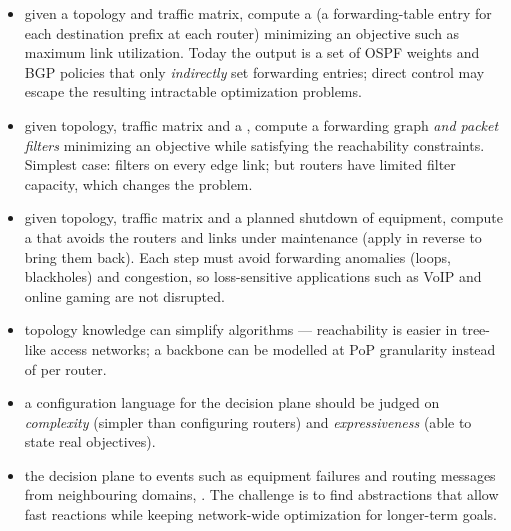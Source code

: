 \begin{itemize}
\item {} given a topology and traffic matrix, compute a  (a forwarding-table entry for each destination prefix at each router) minimizing an objective such as maximum link utilization. Today the output is a set of OSPF weights and BGP policies that only \emph{indirectly} set forwarding entries; direct control may escape the resulting intractable optimization problems.
\item {} given topology, traffic matrix and a , compute a forwarding graph \emph{and packet filters} minimizing an objective while satisfying the reachability constraints. Simplest case: filters on every edge link; but routers have limited filter capacity, which changes the problem.
\item {} given topology, traffic matrix and a planned shutdown of equipment, compute a  that avoids the routers and links under maintenance (apply in reverse to bring them back). Each step must avoid forwarding anomalies (loops, blackholes) and congestion, so loss-sensitive applications such as VoIP and online gaming are not disrupted.
\item {} topology knowledge can simplify algorithms --- reachability is easier in tree-like access networks; a backbone can be modelled at PoP granularity instead of per router.
\item {} a configuration language for the decision plane should be judged on \emph{complexity} (simpler than configuring routers) and \emph{expressiveness} (able to state real objectives).
\item {} the decision plane  to events such as equipment failures and routing messages from neighbouring domains, . The challenge is to find abstractions that allow fast reactions while keeping network-wide optimization for longer-term goals.
\end{itemize}

